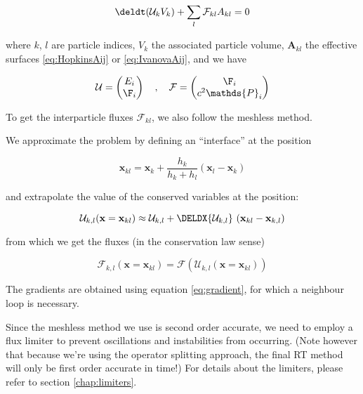 \begin{align}
	\deldt(\mathcal{U}_k V_k) + \sum\limits_{l} \mathcal F_{kl} A_{kl} = 0 \label{eq:meshless}
\end{align}

where $k$, $l$ are particle indices, $V_k$ the associated particle volume, 
$\mathbf{A}_{kl}$ the effective surfaces \ref{eq:HopkinsAij} or \ref{eq:IvanovaAij}, and we have

\begin{align}
	\mathcal{U} =
		\begin{pmatrix}
			E_i \\
			\F_i
		\end{pmatrix}
	\quad , \quad
	\mathcal{F} =
		\begin{pmatrix}
			\F_i \\
			c^2 \mathds{P}_i
		\end{pmatrix}
\end{align}



To get the interparticle fluxes $\mathcal{F}_{kl}$, we also follow the meshless method.

We approximate the problem by defining an ``interface'' at the position

\begin{equation}
	\mathbf{x}_{kl} = \mathbf{x}_k + \frac{h_k}{h_k + h_l} ( \mathbf{x}_l - \mathbf{x}_k )
\end{equation}

and extrapolate the value of the conserved variables at the position:

\begin{equation}
	\mathcal{U}_{k, l}(\mathbf{x} = 
        \mathbf{x}_{kl}) \approx \mathcal{U}_{k, l} + \DELDX{ \mathcal{U}_{k, l}}\ (\mathbf{x}_{kl} - \mathbf{x}_{k,l})
\end{equation}

from which we get the fluxes (in the conservation law sense)

\begin{equation}
	\mathcal{F}_{k, l}(\mathbf{x} = 
        \mathbf{x}_{kl}) = \mathcal{F}\left( \mathcal{U}_{k, l}(\mathbf{x} = \mathbf{x}_{kl}) \right)
\end{equation}


The gradients are obtained using equation \ref{eq:gradient}, for which a neighbour 
loop is necessary.


Since the meshless method we use is second order accurate, we need to employ a 
flux limiter to prevent oscillations and instabilities from occurring.
(Note however that because we're using the operator splitting approach, the 
final RT method will only be first order accurate in time!) For details about
the limiters, please refer to section \ref{chap:limiters}.




